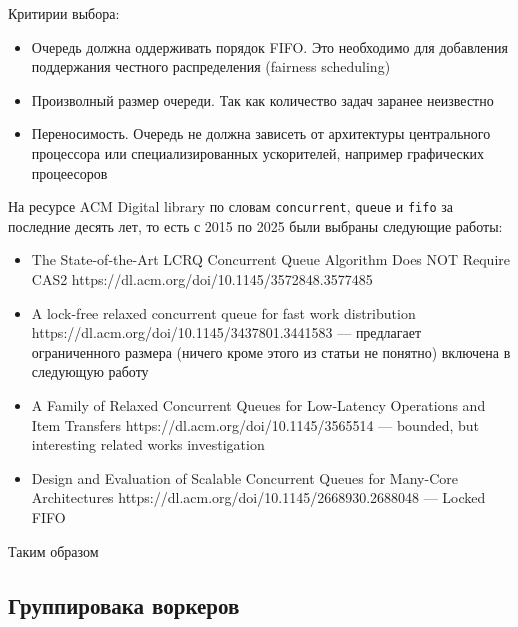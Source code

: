 Критирии выбора:

\begin{itemize}
    \item Очередь должна оддерживать порядок FIFO. Это необходимо для добавления поддержания честного распределения (fairness scheduling)
    \item Произволный размер очереди. Так как количество задач заранее неизвестно
    \item Переносимость. Очередь не должна зависеть от архитектуры центрального процессора или специализированных ускорителей, например графических процеесоров
\end{itemize}

На ресурсе ACM Digital library по словам \verb|concurrent|, \verb|queue| и \verb|fifo| за последние десять лет, то есть с 2015 по 2025 были выбраны следующие работы:

\begin{itemize}
    \item The State-of-the-Art LCRQ Concurrent Queue Algorithm Does NOT Require CAS2\cite{TODO} https://dl.acm.org/doi/10.1145/3572848.3577485
    \item A lock-free relaxed concurrent queue for fast work distribution\cite{TODO}
    https://dl.acm.org/doi/10.1145/3437801.3441583 --- предлагает ограниченного размера (ничего кроме этого из статьи не понятно) включена в следующую работу\cite{TODO}
    \item A Family of Relaxed Concurrent Queues for Low-Latency Operations and Item Transfers\cite{TODO} https://dl.acm.org/doi/10.1145/3565514 --- bounded, but interesting related works investigation
    \item Design and Evaluation of Scalable Concurrent Queues for Many-Core Architectures\cite{TODO} https://dl.acm.org/doi/10.1145/2668930.2688048 --- Locked FIFO
\end{itemize}

Таким образом

\subsection{Группировака воркеров}
